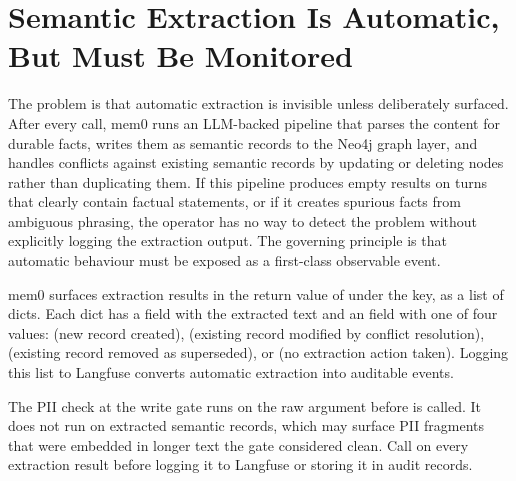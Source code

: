 \section{Semantic Extraction Is Automatic, But Must Be Monitored}
\label{sec:semantic-extraction}

The problem is that automatic extraction is invisible unless deliberately
surfaced. After every  call, mem0 runs an LLM-backed pipeline
that parses the content for durable facts, writes them as semantic records to
the Neo4j graph layer, and handles conflicts against existing semantic records
by updating or deleting nodes rather than duplicating them. If this pipeline
produces empty results on turns that clearly contain factual statements, or
if it creates spurious facts from ambiguous phrasing, the operator has no way
to detect the problem without explicitly logging the extraction output.
The governing principle is that automatic behaviour must be exposed as a
first-class observable event.

mem0 surfaces extraction results in the return value of  under
the  key, as a list of dicts. Each dict has a
 field with the extracted text and an  field
with one of four values:  (new record created), 
(existing record modified by conflict resolution),  (existing
record removed as superseded), or  (no extraction action taken).
Logging this list to Langfuse converts automatic extraction into auditable
events.

\begin{warningbox}
The PII check at the write gate runs on the raw  argument before
 is called. It does not run on extracted semantic records,
which may surface PII fragments that were embedded in longer text the gate
considered clean. Call  on every extraction result
before logging it to Langfuse or storing it in audit records.
\end{warningbox}

